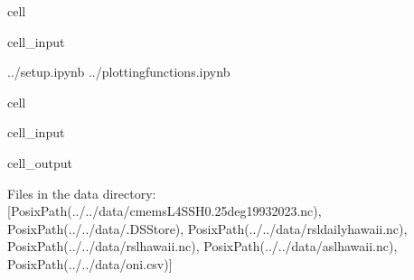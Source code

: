 \documentclass[letterpaper,10pt,english]{jupyterBook}
\begin{document}
\begin{sphinxuseclass}{cell}\begin{sphinxVerbatimInput}

\begin{sphinxuseclass}{cell_input}
\begin{sphinxVerbatim}[commandchars=\\\{\}]
 ../setup.ipynb
 ../plotting\PYGZus{}functions.ipynb
   
   
\end{sphinxVerbatim}

\end{sphinxuseclass}\end{sphinxVerbatimInput}

\end{sphinxuseclass}
\begin{sphinxuseclass}{cell}\begin{sphinxVerbatimInput}

\begin{sphinxuseclass}{cell_input}
\begin{sphinxVerbatim}[commandchars=\\\{\}]
 \PYG{p}{[}      \PYG{p}{]}
\end{sphinxVerbatim}

\end{sphinxuseclass}\end{sphinxVerbatimInput}
\begin{sphinxVerbatimOutput}

\begin{sphinxuseclass}{cell_output}
\begin{sphinxVerbatim}[commandchars=\\\{\}]
Files in the data directory:  [PosixPath(\PYGZsq{}../../data/cmems\PYGZus{}L4\PYGZus{}SSH\PYGZus{}0.25deg\PYGZus{}1993\PYGZus{}2023.nc\PYGZsq{}), PosixPath(\PYGZsq{}../../data/.DS\PYGZus{}Store\PYGZsq{}), PosixPath(\PYGZsq{}../../data/rsl\PYGZus{}daily\PYGZus{}hawaii.nc\PYGZsq{}), PosixPath(\PYGZsq{}../../data/rsl\PYGZus{}hawaii.nc\PYGZsq{}), PosixPath(\PYGZsq{}../../data/asl\PYGZus{}hawaii.nc\PYGZsq{}), PosixPath(\PYGZsq{}../../data/oni.csv\PYGZsq{})]
\end{sphinxVerbatim}

\end{sphinxuseclass}\end{sphinxVerbatimOutput}

\end{sphinxuseclass}
\end{document}
